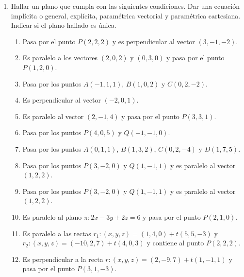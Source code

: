 \documentclass[a4paper]{article}
\newcommand{\exercise}{\item}
\begin{document}
\begin{enumerate}
\begin{enumerate} [label=(\alph*)]
		\item Es paralela a los planos $\pi_1: 2x-3y+5z=2$ y $\pi_2: -x+3y+2z=1$ e incluye al punto $P(2,1,0)$.
	\end{enumerate}

	\exercise Hallar un plano que cumpla con las siguientes condiciones. Dar una ecuación implícita o general, explícita, paramétrica vectorial y paramétrica cartesiana. Indicar si el plano hallado es única.
	\begin{enumerate} [label=(\alph*)]

		\item  Pasa por el punto $P(2,2,2)$ y es perpendicular al vector $(3,-1,-2)$.

		\item  Es paralelo a los vectores $(2,0,2)$ y $(0,3,0)$ y pasa por el punto $P(1,2,0)$.

		\item  Pasa por los puntos $A(-1,1,1)$, $B(1,0,2)$ y $C(0,2,-2)$.

		\item  Es perpendicular al vector $(-2,0,1)$.

		\item  Es paralelo al vector $(2,-1,4)$ y pasa por el punto $P(3,3,1)$.

		\item  Pasa por los puntos $P(4,0,5)$ y $Q(-1,-1,0)$.

		\item  Pasa por los puntos $A(0,1,1)$, $B(1,3,2)$, $C(0,2,-4)$ y $D(1,7,5)$.

		\item  Pasa por los puntos $P(3,-2,0)$ y $Q(1,-1,1)$ y es paralelo al vector $(1,2,2)$.

		\item  Pasa por los puntos $P(3,-2,0)$ y $Q(1,-1,1)$ y es paralelo al vector $(1,2,2)$.

		\item  Es paralelo al plano $\pi: 2x-3y+2z=6$ y pasa por el punto $P(2,1,0)$.

		\item  Es paralelo a las rectas $r_1: (x,y,z)=(1,4,0)+t(5,5,-3)$ y $r_2: (x,y,z)=(-10,2,7)+t(4,0,3)$ y contiene al punto $P(2,2,2)$.

		\item  Es perpendicular a la recta $r: (x,y,z)=(2,-9,7)+t(1,-1,1)$ y pasa por el punto $P(3,1,-3)$.


\end{enumerate}
\end{enumerate}
\end{document}
